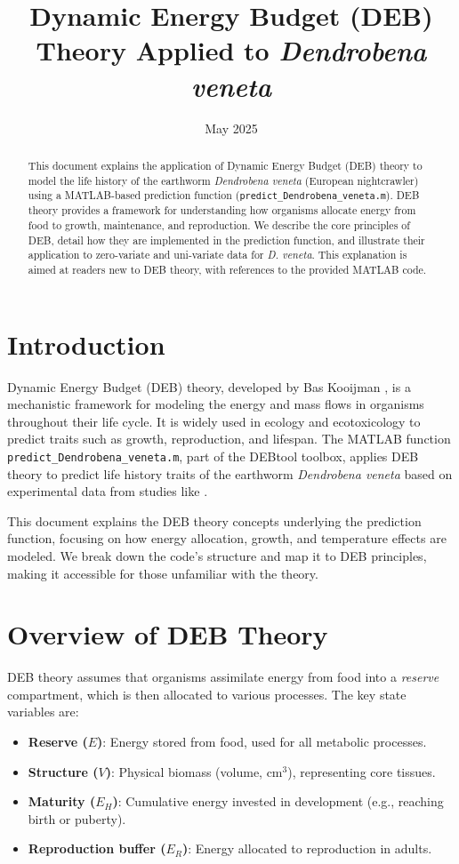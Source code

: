 \documentclass[11pt]{article}
\title{Dynamic Energy Budget (DEB) Theory Applied to \textit{Dendrobena veneta}}
\author{}
\date{May 2025}
\begin{document}
\maketitle

\begin{abstract}
This document explains the application of Dynamic Energy Budget (DEB) theory to model the life history of the earthworm \textit{Dendrobena veneta} (European nightcrawler) using a MATLAB-based prediction function (\texttt{predict\_Dendrobena\_veneta.m}). DEB theory provides a framework for understanding how organisms allocate energy from food to growth, maintenance, and reproduction. We describe the core principles of DEB, detail how they are implemented in the prediction function, and illustrate their application to zero-variate and uni-variate data for \textit{D. veneta}. This explanation is aimed at readers new to DEB theory, with references to the provided MATLAB code.
\end{abstract}

\section{Introduction}
Dynamic Energy Budget (DEB) theory, developed by Bas Kooijman \citep{Kooijman2010}, is a mechanistic framework for modeling the energy and mass flows in organisms throughout their life cycle. It is widely used in ecology and ecotoxicology to predict traits such as growth, reproduction, and lifespan. The MATLAB function \texttt{predict\_Dendrobena\_veneta.m}, part of the DEBtool toolbox, applies DEB theory to predict life history traits of the earthworm \textit{Dendrobena veneta} based on experimental data from studies like \citet{Viljoen1991, Viljoen1992, Kovacevic2023, Podolak2020}.

This document explains the DEB theory concepts underlying the prediction function, focusing on how energy allocation, growth, and temperature effects are modeled. We break down the code’s structure and map it to DEB principles, making it accessible for those unfamiliar with the theory.

\section{Overview of DEB Theory}
DEB theory assumes that organisms assimilate energy from food into a \textit{reserve} compartment, which is then allocated to various processes. The key state variables are:
\begin{itemize}
    \item \textbf{Reserve ($E$)}: Energy stored from food, used for all metabolic processes.
    \item \textbf{Structure ($V$)}: Physical biomass (volume, cm$^3$), representing core tissues.
    \item \textbf{Maturity ($E_H$)}: Cumulative energy invested in development (e.g., reaching birth or puberty).
    \item \textbf{Reproduction buffer ($E_R$)}: Energy allocated to reproduction in adults.
\end{itemize}
\end{document}
